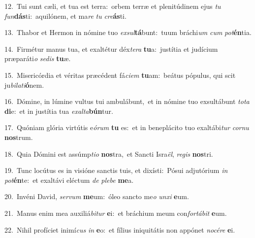 {\numbfont\textcolor{\numbcolor}{12.}}~Tui sunt cæli, et tua est terra:~\dagger orbem terræ et plenitúdinem ejus \textit{tu} \textit{fun}\-\textbf{dás}ti:~\star aquilónem, et ma\textit{re} \textit{tu} \textit{cre}\-\textbf{ás}ti.\par
{\numbfont\textcolor{\numbcolor}{13.}}~Thabor et Hermon in nómine tuo \textit{ex}\-\textit{sul}\textbf{tá}bunt:~\star tuum bráchi\textit{um} \textit{cum} \textit{pot}\-\textbf{én}tia.\par
{\numbfont\textcolor{\numbcolor}{14.}}~Firmétur manus tua, et exaltétur déx\-\textit{te}\-\textit{ra} \textbf{tu}\-a:~\star justítia et judícium præparáti\textit{o} \textit{se}\-\textit{dis} \textbf{tu}\-æ.\par
{\numbfont\textcolor{\numbcolor}{15.}}~Misericórdia et véritas præcédent fá\-\textit{ci}\-\textit{em} \textbf{tu}\-am:~\star beátus pópulus, qui scit ju\-\textit{bi}\-\textit{la}\textit{ti}\textbf{ó}nem.\par
{\numbfont\textcolor{\numbcolor}{16.}}~Dómine, in lúmine vultus tui ambulábunt,~\dagger et in nómine tuo exsultábunt \textit{to}\-\textit{ta} \textbf{di}\-e:~\star et in justítia tua \textit{ex}\-\textit{al}\textit{ta}\textbf{bún}tur.\par
{\numbfont\textcolor{\numbcolor}{17.}}~Quóniam glória virtútis e\-\textit{ó}\-\textit{rum} \textbf{tu} es:~\star et in beneplácito tuo exaltábi\textit{tur} \textit{cor}\-\textit{nu} \textbf{nos}\-trum.\par
{\numbfont\textcolor{\numbcolor}{18.}}~Quia Dómini est assúmp\-\textit{ti}\-\textit{o} \textbf{nos}\-tra,~\star et Sancti Isra\-\textit{ël}\-, \textit{re}\-\textit{gis} \textbf{nos}\-tri.\par
{\numbfont\textcolor{\numbcolor}{19.}}~Tunc locútus es in visióne sanctis tuis, et dixísti:~\dagger Pósui adjutórium \textit{in} \textit{pot}\-\textbf{én}te:~\star et exaltávi eléctum \textit{de} \textit{ple}\-\textit{be} \textbf{me}\-a.\par
{\numbfont\textcolor{\numbcolor}{20.}}~Invéni David, \textit{ser}\-\textit{vum} \textbf{me}\-um:~\star óleo sancto me\textit{o} \textit{un}\-\textit{xi} \textbf{e}\-um.\par
{\numbfont\textcolor{\numbcolor}{21.}}~Manus enim mea auxiliá\-\textit{bi}\-\textit{tur} \textbf{e}\-i:~\star et bráchium meum con\-\textit{for}\-\textit{tá}\textit{bit} \textbf{e}\-um.\par
{\numbfont\textcolor{\numbcolor}{22.}}~Nihil profíciet inimí\textit{cus} \textit{in} \textbf{e}\-o:~\star et fílius iniquitátis non appónet \textit{no}\-\textit{cé}\textit{re} \textbf{e}\-i.\par

